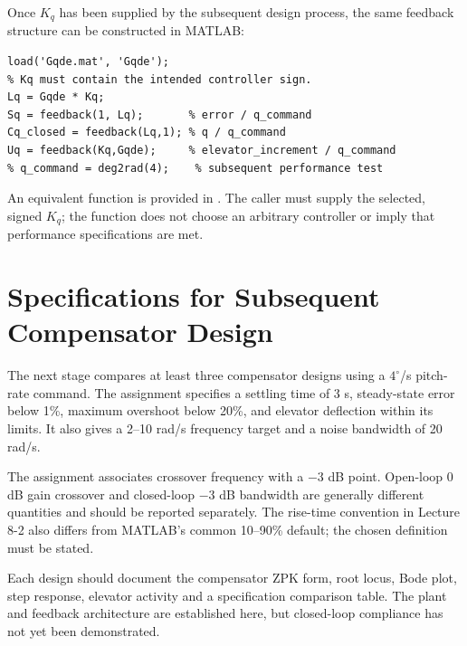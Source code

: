 \documentclass[a4paper,11pt]{article}
\newcommand{\file}[1]{\mbox{\texttt{\small\detokenize{#1}}}}
\begin{document}
Once $K_q$ has been supplied by the subsequent design process, the same feedback structure can be constructed in MATLAB:
\begin{lstlisting}
load('Gqde.mat', 'Gqde');
% Kq must contain the intended controller sign.
Lq = Gqde * Kq;
Sq = feedback(1, Lq);       % error / q_command
Cq_closed = feedback(Lq,1); % q / q_command
Uq = feedback(Kq,Gqde);     % elevator_increment / q_command
% q_command = deg2rad(4);    % subsequent performance test
\end{lstlisting}
An equivalent function is provided in \file{loop.m}. The caller must supply the selected, signed $K_q$; the function does not choose an arbitrary controller or imply that performance specifications are met.

\section{Specifications for Subsequent Compensator Design}
The next stage compares at least three compensator designs using a $4^\circ$/s pitch-rate command. The assignment specifies a settling time of 3 s, steady-state error below 1\%, maximum overshoot below 20\%, and elevator deflection within its limits. It also gives a 2--10 rad/s frequency target and a noise bandwidth of 20 rad/s.

The assignment associates crossover frequency with a $-3$ dB point. Open-loop 0 dB gain crossover and closed-loop $-3$ dB bandwidth are generally different quantities and should be reported separately. The rise-time convention in Lecture 8-2 also differs from MATLAB's common 10--90\% default; the chosen definition must be stated.

Each design should document the compensator ZPK form, root locus, Bode plot, step response, elevator activity and a specification comparison table. The plant and feedback architecture are established here, but closed-loop compliance has not yet been demonstrated.
\end{document}
